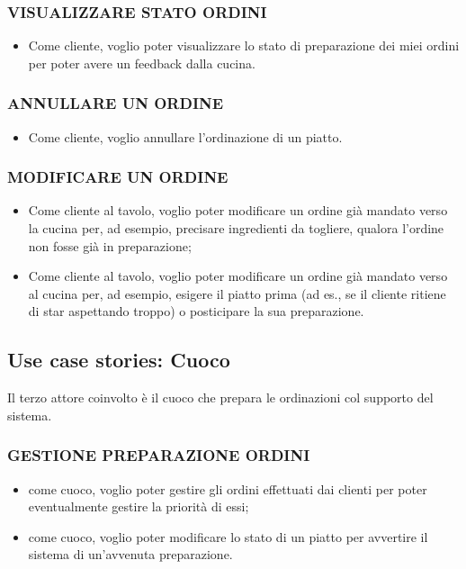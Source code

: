 \subsubsection{VISUALIZZARE STATO ORDINI} 
\begin{itemize}
	\item Come cliente, voglio poter visualizzare lo stato di preparazione dei miei ordini per poter avere un feedback dalla cucina.
\end{itemize}

\subsubsection{ANNULLARE UN ORDINE} 
\begin{itemize}
	\item Come cliente, voglio annullare l’ordinazione di un piatto.
\end{itemize}

\subsubsection{MODIFICARE UN ORDINE} 
\begin{itemize}
	\item Come cliente al tavolo, voglio poter modificare un ordine già mandato verso la cucina per, ad esempio, precisare ingredienti da togliere, qualora l’ordine non fosse già in preparazione;
	\item Come cliente al tavolo, voglio poter modificare un ordine già mandato verso al cucina per, ad esempio, esigere il piatto prima (ad es., se il cliente ritiene di star aspettando troppo) o posticipare la sua preparazione.
\end{itemize}

\subsection{Use case stories: Cuoco}
Il terzo attore coinvolto è il cuoco che prepara le ordinazioni col supporto del sistema.
\subsubsection{GESTIONE PREPARAZIONE ORDINI} 
\begin{itemize}
	\item come cuoco, voglio poter gestire gli ordini effettuati dai clienti per poter eventualmente gestire la priorità di essi;
	\item come cuoco, voglio poter modificare lo stato di un piatto per avvertire il sistema di un’avvenuta preparazione.
\end{itemize}

